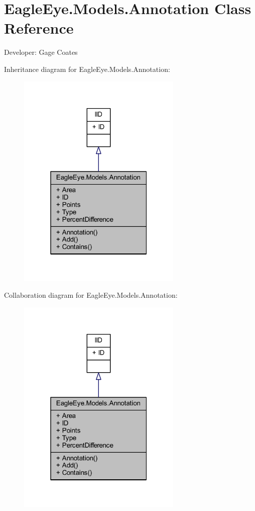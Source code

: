 \hypertarget{class_eagle_eye_1_1_models_1_1_annotation}{}\section{Eagle\+Eye.\+Models.\+Annotation Class Reference}
\label{class_eagle_eye_1_1_models_1_1_annotation}


Developer\+: Gage Coates  




Inheritance diagram for Eagle\+Eye.\+Models.\+Annotation\+:\nopagebreak
\begin{figure}[H]
\begin{center}
\leavevmode
\includegraphics[width=223pt]{class_eagle_eye_1_1_models_1_1_annotation__inherit__graph}
\end{center}
\end{figure}


Collaboration diagram for Eagle\+Eye.\+Models.\+Annotation\+:\nopagebreak
\begin{figure}[H]
\begin{center}
\leavevmode
\includegraphics[width=223pt]{class_eagle_eye_1_1_models_1_1_annotation__coll__graph}
\end{center}
\end{figure}
